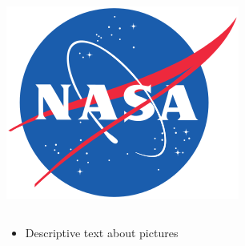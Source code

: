 \begin{frame}
\begin{columns}[t]
    \begin{center}
      \includegraphics[trim=0 0 0 0, clip, width=1.0\textwidth]{Images/NASA_Meatball.png}
      \vspace{-1.2cm}

    \end{center}


    \end{columns}





    \begin{block}{}
      \begin{itemize}
        \item Descriptive text about pictures
      \end{itemize}
    \end{block}

    \end{frame}



